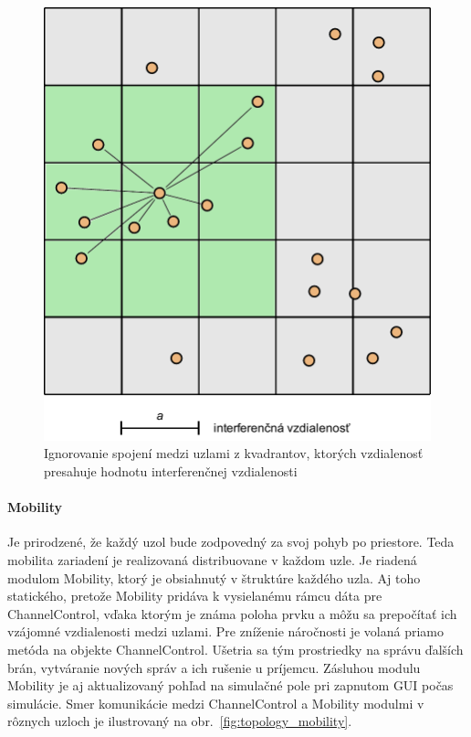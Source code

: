 \begin{figure}[htbp]
\begin{center}
\includegraphics[width=120mm]{figures/channelcontrol_areas}
\caption{Ignorovanie spojení medzi uzlami z kvadrantov, ktorých vzdialenosť presahuje hodnotu interferenčnej vzdialenosti}
\label{fig:channelcontrol_areas}
\end{center}
\end{figure}

\paragraph{Mobility}
\indent Je prirodzené, že každý uzol bude zodpovedný za svoj pohyb po priestore. Teda mobilita zariadení je realizovaná distribuovane v každom uzle. Je riadená modulom \ttfamily Mobility\rmfamily, ktorý je obsiahnutý v štruktúre každého uzla. Aj toho statického, pretože \ttfamily Mobility \rmfamily pridáva k vysielanému rámcu dáta pre \ttfamily ChannelControl\rmfamily, vďaka ktorým je známa poloha prvku a môžu sa prepočítať ich vzájomné vzdialenosti medzi uzlami. Pre zníženie náročnosti je volaná priamo metóda na objekte \ttfamily ChannelControl\rmfamily. Ušetria sa tým prostriedky na správu ďalších brán, vytváranie nových správ a ich rušenie u príjemcu. Zásluhou modulu \ttfamily Mobility \rmfamily je aj aktualizovaný pohľad na simulačné pole pri zapnutom GUI počas simulácie. Smer komunikácie medzi \ttfamily ChannelControl \rmfamily a \ttfamily Mobility \rmfamily modulmi v rôznych uzloch je ilustrovaný na obr.~\ref{fig:topology_mobility}.\\

